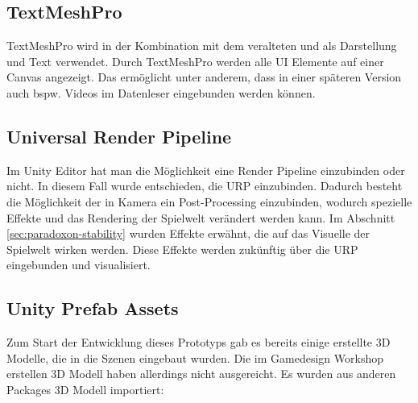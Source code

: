 \subsection{TextMeshPro}
TextMeshPro wird in der Kombination mit dem veralteten  und  als Darstellung und Text verwendet. Durch TextMeshPro werden alle \ac{UI} Elemente auf einer Canvas angezeigt. Das ermöglicht unter anderem, dass in einer späteren Version auch bspw. Videos im Datenleser eingebunden werden können.

\subsection{Universal Render Pipeline}
Im Unity Editor hat man die Möglichkeit eine Render Pipeline einzubinden oder nicht. In diesem Fall wurde entschieden, die \ac{URP} einzubinden. Dadurch besteht die Möglichkeit der in Kamera ein Post-Processing einzubinden, wodurch spezielle Effekte und das Rendering der Spielwelt verändert werden kann. Im Abschnitt \ref{sec:paradoxon-stability}  wurden Effekte erwähnt, die auf das Visuelle der Spielwelt wirken werden. Diese Effekte werden zukünftig über die \ac{URP} eingebunden und visualisiert.

\subsection{Unity Prefab Assets}\label{sec:extra-assets}
Zum Start der Entwicklung dieses Prototyps gab es bereits einige erstellte \ac{3D} Modelle, die in die Szenen eingebaut wurden. Die im Gamedesign Workshop erstellen \ac{3D} Modell haben allerdings nicht ausgereicht. Es wurden aus anderen Packages \ac{3D} Modell importiert:



